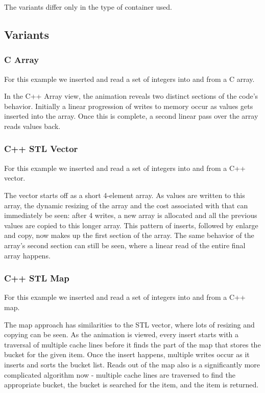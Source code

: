 \documentclass[annual]{acmsiggraph}
\begin{document}
    The variants differ only in the type of container used.

  \subsection{Variants}
  
  \subsubsection{C Array}
  For this example we inserted and read a set of integers into and from a C array.
  
  In the C++ Array view, the animation reveals two distinct sections of the code's behavior. Initially a linear progression of writes to memory occur as values gets inserted into the array. Once this is complete, a second linear pass over the array reads values back. 

  \subsubsection{C++ STL Vector}
  For this example we inserted and read a set of integers into and from a C++ vector.
  
  The vector starts off as a short 4-element array. As values are written to this array, the dynamic resizing of the array and the cost associated with that can immediately be seen: after 4 writes, a new array is allocated and all the previous values are copied to this longer array. This pattern of inserts, followed by enlarge and copy, now makes up the first section of the array. The same behavior of the array's second section can still be seen, where a linear read of the entire final array happens.

  \subsubsection{C++ STL Map}
  For this example we inserted and read a set of integers into and from a C++ map.
  
  The map approach has similarities to the STL vector, where lots of resizing and copying can be seen. As the animation is viewed, every insert starts with a traversal of multiple cache lines before it finds the part of the map that stores the bucket for the given item. Once the insert happens, multiple writes occur as it inserts and sorts the bucket list. 
  Reads out of the map also is a significantly more complicated algorithm now - multiple cache lines are traversed to find the appropriate bucket, the bucket is searched for the item, and the item is returned.
\end{document}

